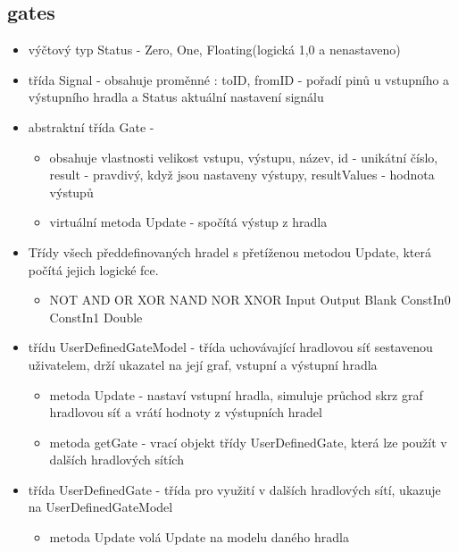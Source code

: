 \documentclass[12pt, oneside]{article}
\begin{document}
\subsection*{gates} 
\begin{itemize} 
\item výčtový typ Status - Zero, One, Floating(logická 1,0 a nenastaveno) 
\item třída Signal - obsahuje proměnné : toID, fromID - pořadí pinů u vstupního a výstupního hradla a Status aktuální nastavení signálu 
\item abstraktní třída Gate - 
\begin{itemize} 
\item obsahuje vlastnosti velikost vstupu, výstupu, název, id - unikátní číslo, result - pravdivý, když jsou nastaveny výstupy, resultValues - hodnota výstupů
\item virtuální metoda Update - spočítá výstup z hradla
\end{itemize} 
\item Třídy všech předdefinovaných hradel s přetíženou metodou Update, která počítá jejich logické fce.
\begin{itemize} 
\item NOT AND OR XOR NAND NOR XNOR Input Output Blank ConstIn0 ConstIn1 Double
\end{itemize} 
\item třídu UserDefinedGateModel - třída uchovávající hradlovou síť sestavenou uživatelem, drží ukazatel na její graf, vstupní a výstupní hradla
\begin{itemize}
\item metoda Update - nastaví vstupní hradla, simuluje průchod skrz graf hradlovou síť a vrátí hodnoty z výstupních hradel 
\item metoda getGate - vrací objekt třídy UserDefinedGate, která lze použít v dalších hradlových sítích 
\end{itemize}
\item třída UserDefinedGate - třída pro využití v dalších hradlových sítí, ukazuje na UserDefinedGateModel
\begin{itemize} 
\item metoda Update volá Update na modelu daného hradla 
\end{itemize} 
\end{itemize}
\newpage
\end{document}
